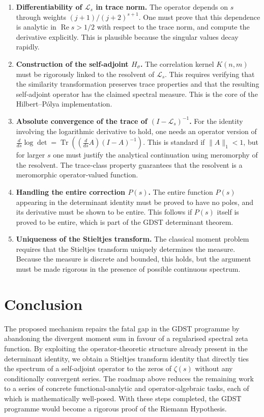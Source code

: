 \documentclass[11pt,a4paper]{article}
\newcommand{\LOp}{\mathcal{L}}
\newcommand{\Tr}{\operatorname{Tr}}
\newcommand{\RE}{\operatorname{Re}}
\begin{document}
\begin{enumerate}[label=(\arabic*)]
\item \textbf{Differentiability of \(\LOp_s\) in trace norm.} The operator depends on \(s\) through weights \((j+1)/(j+2)^{s+1}\). One must prove that this dependence is analytic in \(\RE s > 1/2\) with respect to the trace norm, and compute the derivative explicitly. This is plausible because the singular values decay rapidly.

\item \textbf{Construction of the self‑adjoint \(H_\sigma\).} The correlation kernel \(K(n,m)\) must be rigorously linked to the resolvent of \(\LOp_s\). This requires verifying that the similarity transformation preserves trace properties and that the resulting self‑adjoint operator has the claimed spectral measure. This is the core of the Hilbert–Pólya implementation.

\item \textbf{Absolute convergence of the trace of \((I - \LOp_s)^{-1}\).} For the identity involving the logarithmic derivative to hold, one needs an operator version of $\frac{d}{ds}\log\det = \Tr( (\frac{d}{ds}A) (I-A)^{-1} )$. This is standard if $\|A\|_1 < 1$, but for larger $s$ one must justify the analytical continuation using meromorphy of the resolvent. The trace‑class property guarantees that the resolvent is a meromorphic operator‑valued function.

\item \textbf{Handling the entire correction \(P(s)\).} The entire function \(P(s)\) appearing in the determinant identity must be proved to have no poles, and its derivative must be shown to be entire. This follows if \(P(s)\) itself is proved to be entire, which is part of the GDST determinant theorem.

\item \textbf{Uniqueness of the Stieltjes transform.} The classical moment problem requires that the Stieltjes transform uniquely determines the measure. Because the measure is discrete and bounded, this holds, but the argument must be made rigorous in the presence of possible continuous spectrum.

\end{enumerate}

\section{Conclusion}

The proposed mechanism repairs the fatal gap in the GDST programme by abandoning the divergent moment sum in favour of a regularised spectral zeta function. By exploiting the operator‑theoretic structure already present in the determinant identity, we obtain a Stieltjes transform identity that directly ties the spectrum of a self‑adjoint operator to the zeros of \(\zeta(s)\) without any conditionally convergent series. The roadmap above reduces the remaining work to a series of concrete functional‑analytic and operator‑algebraic tasks, each of which is mathematically well‑posed. With these steps completed, the GDST programme would become a rigorous proof of the Riemann Hypothesis.
\end{document}
